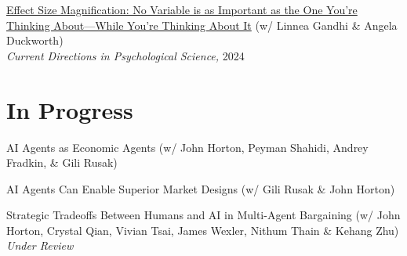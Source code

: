 \documentclass[margin,line,pifont,palatino,courier, 9pt]{res}
\begin{document}
\begin{resume}
\href{https://journals.sagepub.com/doi/full/10.1177/09637214241268222}{Effect Size Magnification: No Variable is as Important as the One You're Thinking About---While You're Thinking About It} (w/ Linnea Gandhi \& Angela Duckworth)\\
\textit{Current Directions in Psychological Science,} 2024

\section{\sc In Progress}
AI Agents as Economic Agents (w/ John Horton, Peyman Shahidi, Andrey Fradkin, \& Gili Rusak)

AI Agents Can Enable Superior Market Designs (w/ Gili Rusak \& John Horton)

Strategic Tradeoffs Between Humans and AI in Multi-Agent Bargaining
(w/ John Horton, Crystal Qian, Vivian Tsai, James Wexler, Nithum Thain \& Kehang Zhu)\\
\textit{Under Review}



\end{resume}
\end{document}
